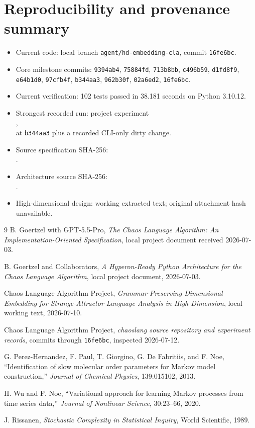 \documentclass[11pt]{article}
\begin{document}
\section*{Reproducibility and provenance summary}
\begin{itemize}[leftmargin=*]
\item Current code: local branch \texttt{agent/hd-embedding-cla}, commit \texttt{16fe6bc}.
\item Core milestone commits: \texttt{9394ab4}, \texttt{75884fd}, \texttt{713b8bb}, \texttt{c496b59}, \texttt{d1fd8f9}, \texttt{e64b1d0}, \texttt{97cfb4f}, \texttt{b344aa3}, \texttt{962b30f}, \texttt{02a6ed2}, \texttt{16fe6bc}.
\item Current verification: 102 tests passed in 38.181 seconds on Python 3.10.12.
\item Strongest recorded run: project experiment\\
,\\
at \texttt{b344aa3} plus a recorded CLI-only dirty change.
\item Source specification SHA-256:\\
.
\item Architecture source SHA-256:\\
.
\item High-dimensional design: working extracted text; original attachment hash unavailable.
\end{itemize}

\begin{thebibliography}{9}
B. Goertzel with GPT-5.5-Pro,
\emph{The Chaos Language Algorithm: An Implementation-Oriented Specification},
local project document received 2026-07-03.

B. Goertzel and Collaborators,
\emph{A Hyperon-Ready Python Architecture for the Chaos Language Algorithm},
local project document, 2026-07-03.

Chaos Language Algorithm Project,
\emph{Grammar-Preserving Dimensional Embedding for Strange-Attractor Language Analysis in High Dimension},
local working text, 2026-07-10.

Chaos Language Algorithm Project,
\emph{chaoslang source repository and experiment records},
commits through \texttt{16fe6bc}, inspected 2026-07-12.

G. Perez-Hernandez, F. Paul, T. Giorgino, G. De Fabritiis, and F. Noe,
``Identification of slow molecular order parameters for Markov model construction,''
\emph{Journal of Chemical Physics}, 139:015102, 2013.

H. Wu and F. Noe,
``Variational approach for learning Markov processes from time series data,''
\emph{Journal of Nonlinear Science}, 30:23--66, 2020.

J. Rissanen,
\emph{Stochastic Complexity in Statistical Inquiry},
World Scientific, 1989.
\end{thebibliography}
\end{document}
